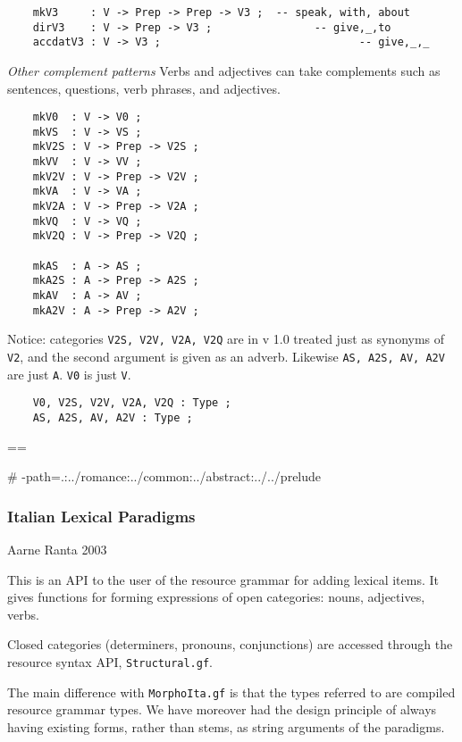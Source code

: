 \documentclass[11pt,a4paper]{article}
\newcommand{\commOut}[1]{}
\newcommand{\subsubsubsection}[1]{\textit{#1}}
\begin{document}
\begin{verbatim}
    mkV3     : V -> Prep -> Prep -> V3 ;  -- speak, with, about
    dirV3    : V -> Prep -> V3 ;                -- give,_,to
    accdatV3 : V -> V3 ;                               -- give,_,_
\end{verbatim}

\subsubsubsection{Other complement patterns}
Verbs and adjectives can take complements such as sentences,
questions, verb phrases, and adjectives.

\begin{verbatim}
    mkV0  : V -> V0 ;
    mkVS  : V -> VS ;
    mkV2S : V -> Prep -> V2S ;
    mkVV  : V -> VV ;
    mkV2V : V -> Prep -> V2V ;
    mkVA  : V -> VA ;
    mkV2A : V -> Prep -> V2A ;
    mkVQ  : V -> VQ ;
    mkV2Q : V -> Prep -> V2Q ;
  
    mkAS  : A -> AS ;
    mkA2S : A -> Prep -> A2S ;
    mkAV  : A -> AV ;
    mkA2V : A -> Prep -> A2V ;
\end{verbatim}

Notice: categories \texttt{V2S, V2V, V2A, V2Q} are in v 1.0 treated
just as synonyms of \texttt{V2}, and the second argument is given
as an adverb. Likewise \texttt{AS, A2S, AV, A2V} are just \texttt{A}.
\texttt{V0} is just \texttt{V}.

\begin{verbatim}
    V0, V2S, V2V, V2A, V2Q : Type ;
    AS, A2S, AV, A2V : Type ;
\end{verbatim}

\commOut{Produced by 
gfdoc - a rudimentary GF document generator.
(c) Aarne Ranta (\htmladdnormallink{aarne@cs.chalmers.se}{mailto:aarne@cs.chalmers.se}) 2002 under GNU GPL.}

==

\# -path=.:../romance:../common:../abstract:../../prelude


\subsubsection{Italian Lexical Paradigms}
Aarne Ranta 2003

This is an API to the user of the resource grammar 
for adding lexical items. It gives functions for forming
expressions of open categories: nouns, adjectives, verbs.

Closed categories (determiners, pronouns, conjunctions) are
accessed through the resource syntax API, \texttt{Structural.gf}. 

The main difference with \texttt{MorphoIta.gf} is that the types
referred to are compiled resource grammar types. We have moreover
had the design principle of always having existing forms, rather
than stems, as string arguments of the paradigms.
\end{document}

